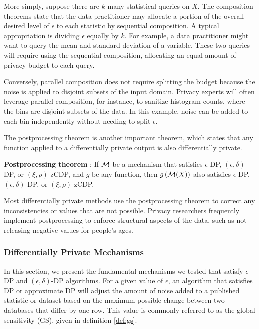 More simply, suppose there are $k$ many statistical queries on $X$. The composition theorems state that the data practitioner may allocate a portion of the overall desired level of $\epsilon$ to each statistic by sequential composition. A typical appropriation is dividing $\epsilon$ equally by $k$. For example, a data practitioner might want to query the mean and standard deviation of a variable. These two queries will require using the sequential composition, allocating an equal amount of privacy budget to each query.

Conversely, parallel composition does not require splitting the budget because the noise is applied to disjoint subsets of the input domain. Privacy experts will often leverage parallel composition, for instance, to sanitize histogram counts, where the bins are disjoint subsets of the data. In this example, noise can be added to each bin independently without needing to split $\epsilon$.

The postprocessing theorem is another important theorem, which states that any function applied to a differentially private output is also differentially private.

\begin{thm}\label{thm:post} \textbf{Postprocessing theorem} \citep{dwork2006calibrating,nissim2007smooth, bun2016concentrated}:
If $\mathcal{M}$ be a mechanism that satisfies $\epsilon$-DP, $(\epsilon,\delta)$-DP, or $(\xi,\rho)$-zCDP, and $g$ be any function, then $g\left(\mathcal{M}(X)\right)$ also satisfies $\epsilon$-DP, $(\epsilon,\delta)$-DP, or $(\xi,\rho)$-zCDP.
\end{thm}

Most differentially private methods use the postprocessing theorem to correct any inconsistencies or values that are not possible. Privacy researchers frequently implement postprocessing to enforce structural aspects of the data, such as not releasing negative values for people's ages.

\subsubsection{Differentially Private Mechanisms}\label{subsec:mech}
In this section, we present the fundamental mechanisms we tested that satisfy $\epsilon$-DP and $(\epsilon, \delta)$-DP algorithms. For a given value of $\epsilon$, an algorithm that satisfies DP or approximate DP will adjust the amount of noise added to a published statistic or dataset based on the maximum possible change between two databases that differ by one row. This value is commonly referred to as the global sensitivity (GS), given in definition \ref{def:gs}.

